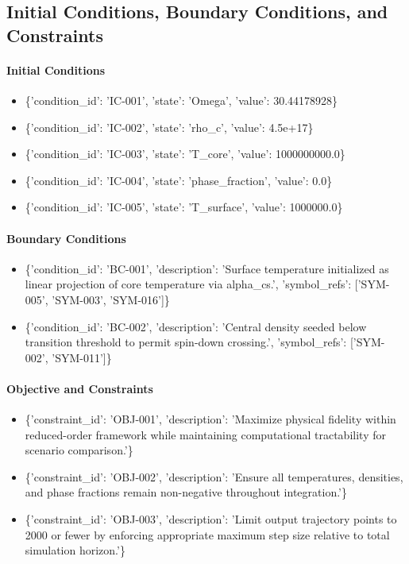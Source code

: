 \documentclass[11pt]{article}
\begin{document}
\subsection{Initial Conditions, Boundary Conditions, and Constraints}

\paragraph{Initial Conditions}
\begin{itemize}
\item \{'condition\_id': 'IC-001', 'state': 'Omega', 'value': 30.44178928\}
\item \{'condition\_id': 'IC-002', 'state': 'rho\_c', 'value': 4.5e+17\}
\item \{'condition\_id': 'IC-003', 'state': 'T\_core', 'value': 1000000000.0\}
\item \{'condition\_id': 'IC-004', 'state': 'phase\_fraction', 'value': 0.0\}
\item \{'condition\_id': 'IC-005', 'state': 'T\_surface', 'value': 1000000.0\}
\end{itemize}

\paragraph{Boundary Conditions}
\begin{itemize}
\item \{'condition\_id': 'BC-001', 'description': 'Surface temperature initialized as linear projection of core temperature via alpha\_cs.', 'symbol\_refs': ['SYM-005', 'SYM-003', 'SYM-016']\}
\item \{'condition\_id': 'BC-002', 'description': 'Central density seeded below transition threshold to permit spin-down crossing.', 'symbol\_refs': ['SYM-002', 'SYM-011']\}
\end{itemize}

\paragraph{Objective and Constraints}
\begin{itemize}
\item \{'constraint\_id': 'OBJ-001', 'description': 'Maximize physical fidelity within reduced-order framework while maintaining computational tractability for scenario comparison.'\}
\item \{'constraint\_id': 'OBJ-002', 'description': 'Ensure all temperatures, densities, and phase fractions remain non-negative throughout integration.'\}
\item \{'constraint\_id': 'OBJ-003', 'description': 'Limit output trajectory points to 2000 or fewer by enforcing appropriate maximum step size relative to total simulation horizon.'\}
\end{itemize}
\end{document}

